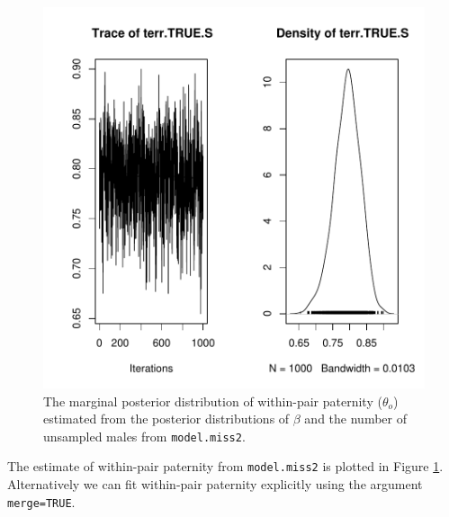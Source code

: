 \documentclass{article}
\begin{document}
\begin{figure}[!h]
\begin{center}
\includegraphics{Tutorial-083}
\end{center}
\caption{The marginal posterior distribution of within-pair paternity ($\theta_o$) estimated from the posterior distributions of $\beta$ and the number of unsampled males from \texttt{model.miss2}.}
\label{EPP2Test-fig}
\end{figure}

The estimate of within-pair paternity from \texttt{model.miss2} is plotted in Figure \ref{EPP2Test-fig}.  Alternatively we can fit within-pair paternity explicitly using the argument \texttt{merge=TRUE}. 

\begin{Schunk}
\end{Schunk}
\end{document}
